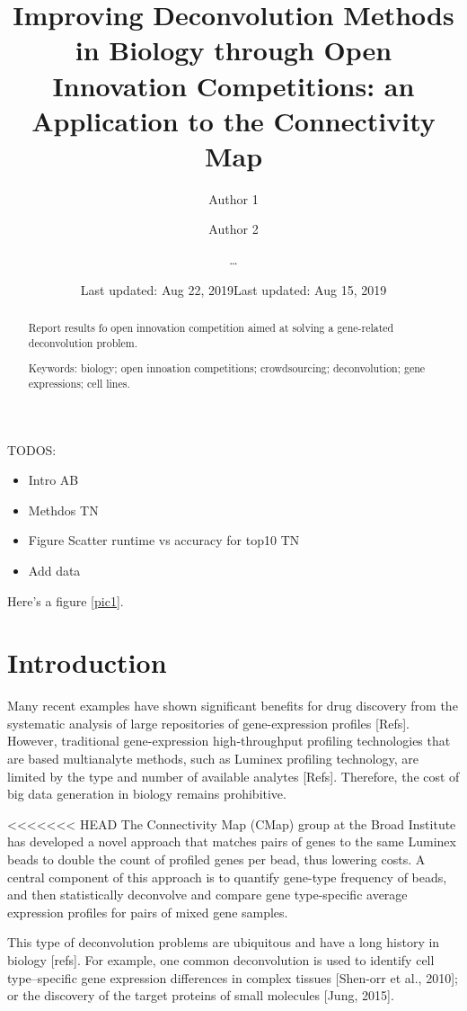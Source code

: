 \documentclass[]{article}
\title{Improving Deconvolution Methods in Biology through Open Innovation
Competitions: an Application to the Connectivity Map}
\author{Author 1 \and Author 2 \and \ldots{}}
\date{Last updated: Aug 22, 2019}
\date{Last updated: Aug 15, 2019}
\providecommand{\tightlist}{%
  \setlength{\itemsep}{0pt}\setlength{\parskip}{0pt}}
\begin{document}
\maketitle
\begin{abstract}
Report results fo open innovation competition aimed at solving a
gene-related deconvolution problem.


\smallskip\noindent 
Keywords: biology; open innoation competitions; crowdsourcing; deconvolution; gene expressions; cell lines.
\end{abstract}

{
\setcounter{tocdepth}{2}
\newpage
\tableofcontents
\newpage
}
TODOS:

\begin{itemize}
\tightlist
\item
  Intro AB
\item
  Methdos TN
\item
  Figure Scatter runtime vs accuracy for top10 TN
\item
  Add data
\end{itemize}

Here's a figure \ref{pic1}.

\hypertarget{introduction}{%
\section{Introduction}\label{introduction}}

Many recent examples have shown significant benefits for drug discovery
from the systematic analysis of large repositories of gene-expression
profiles {[}Refs{]}. However, traditional gene-expression
high-throughput profiling technologies that are based multianalyte
methods, such as Luminex profiling technology, are limited by the type
and number of available analytes {[}Refs{]}. Therefore, the cost of big
data generation in biology remains prohibitive.

<<<<<<< HEAD
The Connectivity Map (CMap) group at the Broad Institute has developed a
novel approach that matches pairs of genes to the same Luminex beads to
double the count of profiled genes per bead, thus lowering costs. A
central component of this approach is to quantify gene-type frequency of
beads, and then statistically deconvolve and compare gene type-specific
average expression profiles for pairs of mixed gene samples.

This type of deconvolution problems are ubiquitous and have a long
history in biology {[}refs{]}. For example, one common deconvolution is
used to identify cell type--specific gene expression differences in
complex tissues {[}Shen-orr et al., 2010{]}; or the discovery of the
target proteins of small molecules {[}Jung, 2015{]}.
\end{document}
